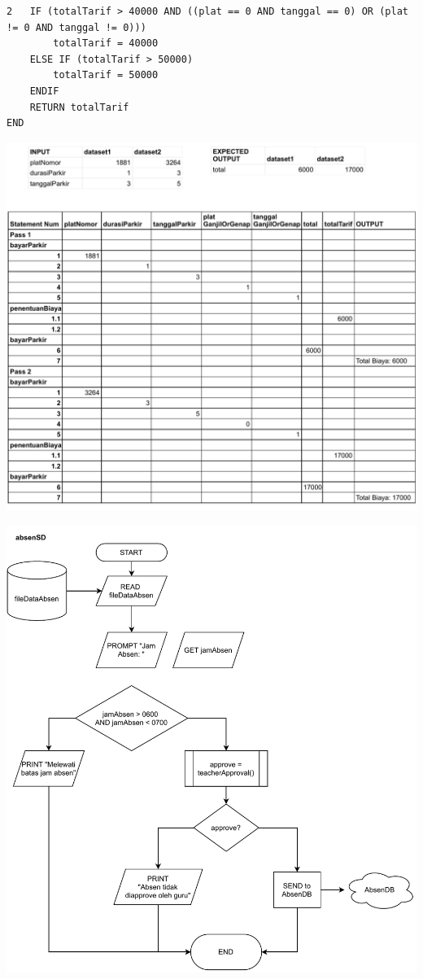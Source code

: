 \documentclass[
  11pt,
  answers  
]{exam}
\begin{document}
\begin{questions}
\begin{solution}
\begin{lstlisting}
2	IF (totalTarif > 40000 AND ((plat == 0 AND tanggal == 0) OR (plat != 0 AND tanggal != 0)))
		totalTarif = 40000
	ELSE IF (totalTarif > 50000)
		totalTarif = 50000
	ENDIF
	RETURN totalTarif
END
      \end{lstlisting}
      \includegraphics[clip,scale=0.8]{pdf/nomor1.pdf}
    \end{solution}
    \pagebreak
    \question
    \begin{solution}
      \includegraphics[clip,scale=0.8]{pdf/nomor2.pdf}

\end{solution}
\end{questions}
\end{document}
